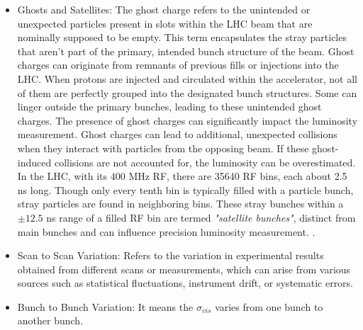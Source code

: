 \begin{itemize}
\item Ghosts and Satellites: The ghost charge refers to the unintended or unexpected particles present in slots within the LHC beam that are nominally supposed to be empty. This term encapsulates the stray particles that aren't part of the primary, intended bunch structure of the beam. Ghost charges can originate from remnants of previous fills or injections into the LHC. When protons are injected and circulated within the accelerator, not all of them are perfectly grouped into the designated bunch structures. Some can linger outside the primary bunches, leading to these unintended ghost charges. The presence of ghost charges can significantly impact the luminosity measurement. Ghost charges can lead to additional, unexpected collisions when they interact with particles from the opposing beam. If these ghost-induced collisions are not accounted for, the luminosity can be overestimated. In the LHC, with its 400 MHz RF, there are 35640 RF bins, each about 2.5 ns long. Though only every tenth bin is typically filled with a particle bunch, stray particles are found in neighboring bins. These stray bunches within a \(\pm 12.5 \) ns range of a filled RF bin are termed \textit{"satellite bunches"}, distinct from main bunches and can influence precision luminosity measurement.
 \cite{Alici:1427728}.


\item Scan to Scan Variation: Refers to the variation in experimental results obtained from different scans or measurements, which can arise from various sources such as statistical fluctuations, instrument drift, or systematic errors.

\item Bunch to Bunch Variation: It means the $\sigma_{vis}$  varies from one bunch to another bunch.



\end{itemize}
